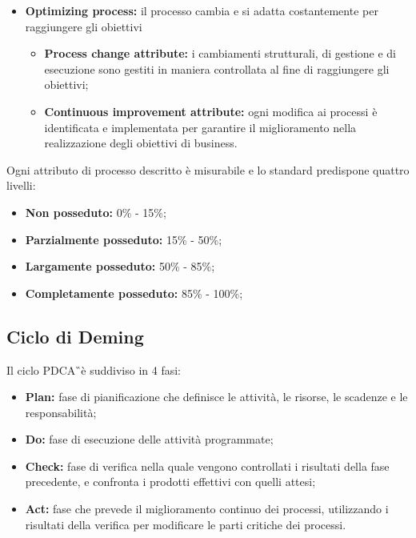 \begin{itemize}
	\item \textbf{Optimizing process:} il processo cambia e si adatta costantemente per raggiungere gli obiettivi
	\begin{itemize}
		\item \textbf{Process change attribute:} i cambiamenti strutturali, di gestione e di esecuzione sono gestiti in maniera controllata al fine di raggiungere gli obiettivi;
		\item \textbf{Continuous improvement attribute:} ogni modifica ai 
		processi è identificata e implementata per garantire il miglioramento 
		nella realizzazione degli obiettivi di business.
	\end{itemize}
		
\end{itemize}

Ogni attributo di processo descritto è misurabile e lo standard predispone quattro livelli:

\begin{itemize}
	\item \textbf{Non posseduto:} 0\% - 15\%;
	\item \textbf{Parzialmente posseduto:} 15\% - 50\%;
	\item \textbf{Largamente posseduto:} 50\% - 85\%;
	\item \textbf{Completamente posseduto:} 85\% - 100\%;
\end{itemize}

\subsection{Ciclo di Deming}

Il ciclo PDCA\G\ è suddiviso in 4 fasi:

\begin{itemize}
	\item \textbf{Plan:} fase di pianificazione che definisce le attività, le risorse, le scadenze e le responsabilità;
	
	\item \textbf{Do:} fase di esecuzione delle attività programmate;
	
	\item \textbf{Check:} fase di verifica nella quale vengono controllati i risultati della fase precedente, e confronta i prodotti effettivi con quelli attesi;
	
	\item \textbf{Act:} fase che prevede il miglioramento continuo dei processi, utilizzando i risultati della verifica per modificare le parti critiche dei processi.
\end{itemize}

